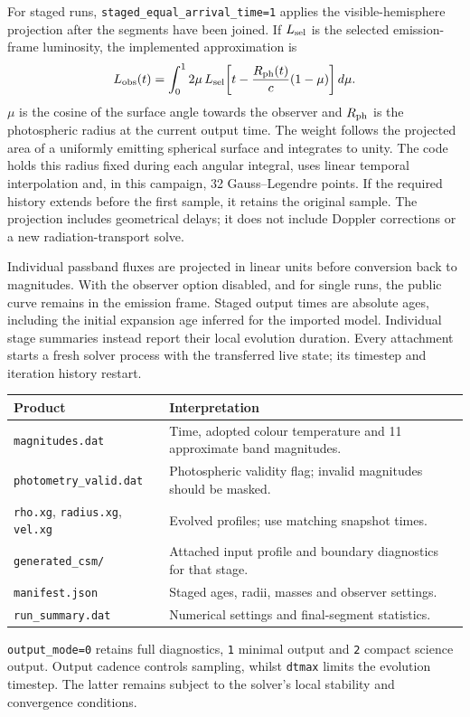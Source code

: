 \documentclass[11pt,a4paper]{article}
\newcommand{\code}[1]{\nolinkurl{#1}}
\begin{document}
For staged runs, \code{staged_equal_arrival_time=1} applies the visible-hemisphere projection after the segments have been joined. If $L_{\rm sel}$ is the selected emission-frame luminosity, the implemented approximation is
\begin{equation}
 L_{\rm obs}(t)=\int_0^1 2\mu\,
 L_{\rm sel}\!\left[t-\frac{R_{\rm ph}(t)}{c}(1-\mu)\right]d\mu .
 \label{eq:observer}
\end{equation}
$\mu$ is the cosine of the surface angle towards the observer and $R_{\rm ph}$ is the photospheric radius at the current output time. The weight follows the projected area of a uniformly emitting spherical surface and integrates to unity. The code holds this radius fixed during each angular integral, uses linear temporal interpolation and, in this campaign, 32 Gauss--Legendre points. If the required history extends before the first sample, it retains the original sample. The projection includes geometrical delays; it does not include Doppler corrections or a new radiation-transport solve.

Individual passband fluxes are projected in linear units before conversion back to magnitudes. With the observer option disabled, and for single runs, the public curve remains in the emission frame. Staged output times are absolute ages, including the initial expansion age inferred for the imported model. Individual stage summaries instead report their local evolution duration. Every attachment starts a fresh solver process with the transferred live state; its timestep and iteration history restart.

\begin{center}\small
\begin{tabularx}{\linewidth}{@{}lX@{}}\toprule
Product & Interpretation\\\midrule
\code{magnitudes.dat} & Time, adopted colour temperature and 11 approximate band magnitudes.\\
\code{photometry_valid.dat} & Photospheric validity flag; invalid magnitudes should be masked.\\
\code{rho.xg}, \code{radius.xg}, \code{vel.xg} & Evolved profiles; use matching snapshot times.\\
\code{generated_csm/} & Attached input profile and boundary diagnostics for that stage.\\
\code{manifest.json} & Staged ages, radii, masses and observer settings.\\
\code{run_summary.dat} & Numerical settings and final-segment statistics.\\\bottomrule
\end{tabularx}
\end{center}
\code{output_mode=0} retains full diagnostics, \code{1} minimal output and \code{2} compact science output. Output cadence controls sampling, whilst \code{dtmax} limits the evolution timestep. The latter remains subject to the solver's local stability and convergence conditions.
\end{document}

